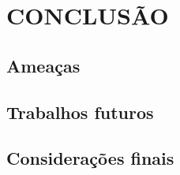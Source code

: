 \documentclass[12pt,openany,oneside,a4paper,english,brazil]{abntbibufjf}
\begin{document}
\chapter{CONCLUSÃO}\label{chap:conclusao}

  \section{Ameaças}\label{sec:ameacas}

  \section{Trabalhos futuros}\label{sec:trabalhos_futuros}

  \section{Considerações finais}\label{sec:consideracoes_finais}






\postextual








\end{document}
